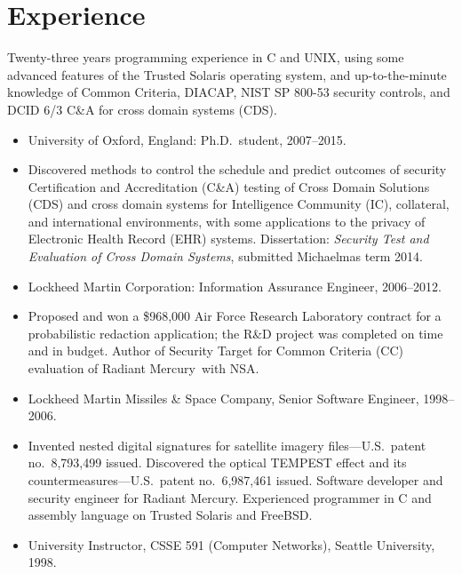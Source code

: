 \documentclass[12pt,twoside,letterpaper]{article}
\providecommand{\rmtrademark}{\raisebox{\height}{\tiny (TM)}}
\newenvironment{myquote}{\list{}{\leftmargin=0.15in\rightmargin=0in}\item[]}{\endlist}
\begin{document}
\vspace{-8mm}
\section*{Experience}
\vspace{-2mm}

Twenty-three years programming experience in C and UNIX, using some
advanced features of the Trusted Solaris operating system, and
up-to-the-minute knowledge of Common Criteria, DIACAP, NIST SP 800-53
security controls, and DCID 6/3 C\&A for cross domain systems (CDS).

\begin{itemize}
	\item University of Oxford, England: Ph.D.\ student, 2007--2015.
		\vspace{-2mm}
		\begin{myquote}
			Discovered methods to control the schedule and predict
			outcomes of security Certification and Accreditation
			(C\&A) testing of Cross Domain Solutions (CDS) and cross
			domain systems for Intelligence Community (IC), collateral,
			and international environments, with some applications to the
			privacy of Electronic Health Record (EHR) systems. Dissertation:
			\emph{Security Test and Evaluation of Cross Domain Systems},
			submitted Michaelmas term 2014.
		\end{myquote}
\vspace{-2.5mm}
	\item Lockheed Martin Corporation: Information Assurance Engineer, 2006--2012.
		\vspace{-2mm}
		\begin{myquote}
			Proposed and won a \$968,000 Air Force Research Laboratory contract
			for a probabilistic redaction application; the R\&D project was completed
			on time and in budget. Author of Security Target for Common Criteria
			(CC) evaluation of Radiant Mercury\rmtrademark\ with
			NSA.
		\end{myquote}
\vspace{-2.5mm}
	\item Lockheed Martin Missiles \& Space Company, Senior Software Engineer, 1998--2006.
		\vspace{-2mm}
		\begin{myquote}
			Invented nested digital signatures for satellite imagery
			files---U.S.\ patent no.~8,793,499 issued. Discovered the
			optical TEMPEST effect and its countermeasures---U.S.\ patent
			no.~6,987,461 issued. Software developer and security engineer
			for Radiant Mercury\rmtrademark. Experienced programmer
			in C and assembly language on Trusted Solaris and FreeBSD.
		\end{myquote}
\vspace{-2.5mm}
	\item University Instructor, CSSE 591 (Computer Networks), Seattle University, 1998.
\end{itemize}
\end{document}
